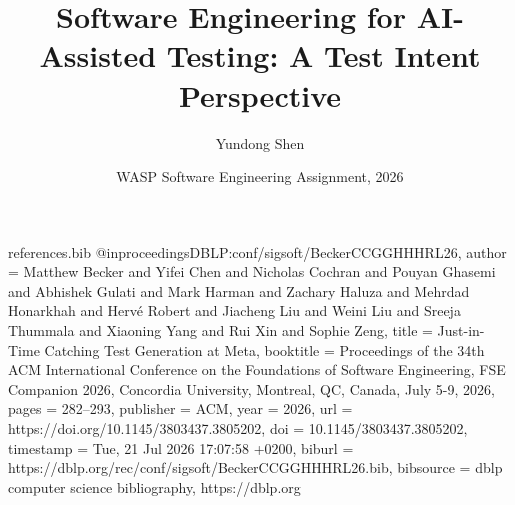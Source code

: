 \begin{filecontents*}{references.bib}
    @inproceedings{DBLP:conf/sigsoft/BeckerCCGGHHHRL26,
      author       = {Matthew Becker and
                      Yifei Chen and
                      Nicholas Cochran and
                      Pouyan Ghasemi and
                      Abhishek Gulati and
                      Mark Harman and
                      Zachary Haluza and
                      Mehrdad Honarkhah and
                      Herv{\'{e}} Robert and
                      Jiacheng Liu and
                      Weini Liu and
                      Sreeja Thummala and
                      Xiaoning Yang and
                      Rui Xin and
                      Sophie Zeng},
      title        = {Just-in-Time Catching Test Generation at Meta},
      booktitle    = {Proceedings of the 34th {ACM} International Conference on the Foundations
                      of Software Engineering, {FSE} Companion 2026, Concordia University,
                      Montreal, QC, Canada, July 5-9, 2026},
      pages        = {282--293},
      publisher    = {{ACM}},
      year         = {2026},
      url          = {https://doi.org/10.1145/3803437.3805202},
      doi          = {10.1145/3803437.3805202},
      timestamp    = {Tue, 21 Jul 2026 17:07:58 +0200},
      biburl       = {https://dblp.org/rec/conf/sigsoft/BeckerCCGGHHHRL26.bib},
      bibsource    = {dblp computer science bibliography, https://dblp.org}
    }
    
    \end{filecontents*}
    


\documentclass[11pt,a4paper]{article}

\usepackage[a4paper,margin=2.5cm]{geometry}
\usepackage[T1]{fontenc}
\usepackage[utf8]{inputenc}
\usepackage{newtxtext,newtxmath}
\usepackage{microtype}
\usepackage{enumitem}
\usepackage[hidelinks]{hyperref}
\usepackage{xurl}
\usepackage{parskip}

\setlength{\parindent}{0pt}
\setlength{\parskip}{4.5pt plus 1pt minus 1pt}
\emergencystretch=2em

\title{Software Engineering for AI-Assisted Testing: A Test Intent Perspective}
\author{Yundong Shen}
\date{WASP Software Engineering Assignment, 2026}



\maketitle

\section{Introduction}

